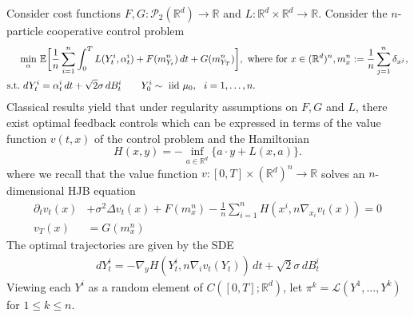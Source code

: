 \documentclass[11pt,reqno]{amsart}
\numberwithin{equation}{section}
\theoremstyle{definition}
\def\E{{\mathbb E}}
\def\R{{\mathbb R}}
\def\Law{\mathcal{L}}
\begin{document}
Consider cost functions $F,G:\mathcal P_2(\R^d)\to \R$ and $L:\R^d\times \R^d\to \R$. Consider the $n$-particle cooperative control problem
\begin{align}
\label{eq: n player control}
\begin{split}
    \min_{\alpha}\,\,&\E\bigg[\frac 1n\sum_{i=1}^n\int_0^T L(Y_t^i,\alpha_t^i)+ F(m_{Y_t}^n)\,dt+ G(m_{Y_T}^n)\bigg],\text{ where for } x \in (\R^d)^n, m^n_x := \frac{1}{n}\sum_{j=1}^n \delta_{x^j}, \\
    \text{s.t.\,\,} dY_t^i&= \alpha_t^i\,dt+\sqrt 2 \sigma\, dB_t^i \qquad Y_0^i \sim \text{ iid }  \mu_0 , \ \   i=1,\dots,n.
    \end{split}
\end{align}
Classical results yield that under regularity assumptions on $F,G$ and $L$, there exist optimal feedback controls which can be expressed in terms of the value function $v(t,x)$ of the control problem and the Hamiltonian
\begin{equation*}
    H(x,y) = -\inf_{a \in \R^d}\{a\cdot y+L(x,a)\}.
\end{equation*}
where we recall that the value function $v : [0,T] \times (\R^{d})^n \to \R$ solves an $n$-dimensional HJB equation
\begin{align*}
    \partial_t v_t(x)&+\sigma^2\Delta v_t(x)+F(m_{x}^n)-\frac 1n\sum_{i=1}^n H(x^i,n\nabla_{x_i}v_t(x))=0\\
    v_T(x)&=G(m_x^n)
\end{align*}
The optimal trajectories are given by the SDE
\begin{align}
\label{eq: n-control optimal trajectories}
    dY_t^i=-\nabla_y H(Y_t^i,n\nabla_i v_t(Y_t))\,dt+\sqrt 2 \sigma\,dB_t^i
\end{align}
Viewing each $Y^i$ as a random element of $C([0,T];\R^d)$, let $\pi^k=\Law(Y^1,\dots,Y^k)$ for $1 \le k \le n$.
\end{document}
